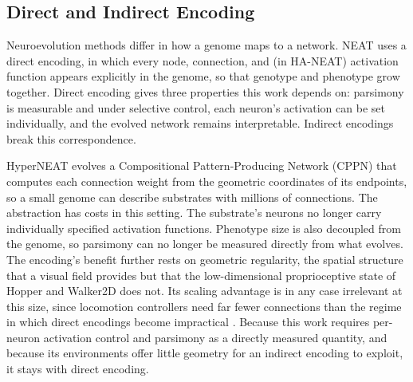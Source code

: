 \documentclass[12pt]{article}
\begin{document}
\subsection{Direct and Indirect Encoding}


Neuroevolution methods differ in how a genome maps to a network. NEAT uses a
direct encoding, in which every node, connection, and (in HA-NEAT) activation
function appears explicitly in the genome, so that genotype and phenotype grow
together. Direct encoding gives three properties this work depends on: parsimony
is measurable and under selective control, each neuron's activation can be set
individually, and the evolved network remains interpretable. Indirect encodings
break this correspondence. 

HyperNEAT \cite{stanley_hypercubebased_2009} evolves
a Compositional Pattern-Producing Network (CPPN) \cite{stanley_compositional_2007}
that computes each connection weight from the geometric coordinates of its
endpoints, so a small genome can describe substrates with millions of
connections. The abstraction has costs in this setting. The substrate's neurons
no longer carry individually specified activation functions. Phenotype size is
also decoupled from the genome, so parsimony can no longer be measured directly
from what evolves. The encoding's benefit further rests on geometric regularity,
the spatial structure that a visual field provides but that the low-dimensional
proprioceptive state of Hopper and Walker2D does not. Its scaling advantage is in
any case irrelevant at this size, since locomotion controllers need far fewer
connections than the regime in which direct encodings become impractical
\cite{stanley_hypercubebased_2009}. Because this work requires per-neuron
activation control and parsimony as a directly measured quantity, and because its
environments offer little geometry for an indirect encoding to exploit, it stays
with direct encoding.
\end{document}
